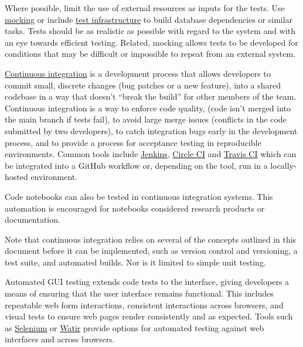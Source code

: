 \documentclass{article}
\newcounter{subsubsubsection}[subsubsection]
\begin{document}
Where possible, limit the use of external resources as inputs for the tests. Use \href{http://martinfowler.com/articles/mocksArentStubs.html} {mocking} \autocite{fowler_mocks_2007} or include \href{https://testing.googleblog.com/2012/10/hermetic-servers.html} {test infrastructure} to build database dependencies \autocite{narla_hermetic_2012} or similar tasks. Tests should be as realistic as possible with regard to the system and with an eye towards efficient testing. Related, mocking allows tests to be developed for conditions that may be difficult or impossible to repeat from an external system.

\href{http://martinfowler.com/articles/continuousIntegration.html} {Continuous integration} \autocite{fowler_continuous_2006} is a development process that allows developers to commit small, discrete changes (bug patches or a new feature), into a shared codebase in a way that doesn’t “break the build” for other members of the team. Continuous integration is a way to enforce code quality, (code isn’t merged into the main branch if tests fail), to avoid large merge issues (conflicts in the code submitted by two developers), to catch integration bugs early in the development process, and to provide a process for acceptance testing in reproducible environments. Common tools include \href{https://jenkins.io/index.html} {Jenkins}, \href{https://circleci.com/} {Circle CI} and \href{https://travis-ci.org/} {Travis CI} which can be integrated into a GitHub workflow or, depending on the tool, run in a locally-hosted environment.
 
Code notebooks can also be tested in continuous integration systems. This automation is encouraged for notebooks considered research products or documentation.
 
Note that continuous integration relies on several of the concepts outlined in this document before it can be implemented, such as version control and versioning, a test suite, and automated builds. Nor is it limited to simple unit testing. 

Automated GUI testing extends code tests to the interface, giving developers a means of ensuring that the user interface remains functional. This includes repeatable web form interactions, consistent interactions across browsers, and visual tests to ensure web pages render consistently and as expected. Tools such as \href{http://www.seleniumhq.org/} {Selenium} or \href{https://watir.com/} {Watir} provide options for automated testing against web interfaces and across browsers. 
\end{document}
